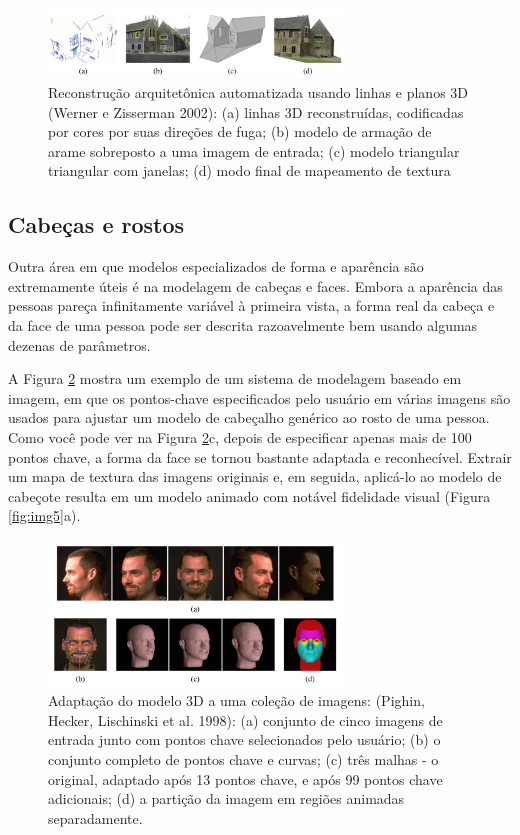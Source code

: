 \documentclass{article}
\begin{document}
\begin{figure}[!htb]
    \centering
    \includegraphics[width=0.7\textwidth]{img3.png}
    \caption{Reconstrução arquitetônica automatizada usando linhas e planos 3D (Werner e Zisserman 2002)\cite{Werner}: (a) linhas 3D reconstruídas, codificadas por cores por suas direções de fuga; (b) modelo de armação de arame sobreposto a uma imagem de entrada; (c) modelo triangular triangular com janelas; (d) modo final de mapeamento de textura
}
    \label{fig:img3}
\end{figure}

\subsection{Cabeças e rostos}
Outra área em que modelos especializados de forma e aparência são extremamente úteis é na modelagem de cabeças e faces. Embora a aparência das pessoas pareça infinitamente variável à primeira vista, a forma real da cabeça e da face de uma pessoa pode ser descrita razoavelmente bem usando algumas dezenas de parâmetros.

A Figura \ref{fig:img4} mostra um exemplo de um sistema de modelagem baseado em imagem, em que os pontos-chave especificados pelo usuário em várias imagens são usados para ajustar um modelo de cabeçalho genérico ao rosto de uma pessoa. Como você pode ver na Figura \ref{fig:img4}c, depois de especificar apenas mais de 100 pontos chave, a forma da face se tornou bastante adaptada e reconhecível. Extrair um mapa de textura das imagens originais e, em seguida, aplicá-lo ao modelo de cabeçote resulta em um modelo animado com notável fidelidade visual (Figura \ref{fig:img5}a).


\begin{figure}[!htb]
    \centering
    \includegraphics[width=0.7\textwidth]{img4.png}
    \caption{Adaptação do modelo 3D a uma coleção de imagens: (Pighin, Hecker, Lischinski et al. 1998): (a) conjunto de cinco imagens de entrada junto com pontos chave selecionados pelo usuário; (b) o conjunto completo de pontos chave e curvas; (c) três malhas - o original, adaptado após 13 pontos chave, e após 99 pontos chave adicionais; (d) a partição da imagem em regiões animadas separadamente.
}
    \label{fig:img4}
\end{figure}
\end{document}
